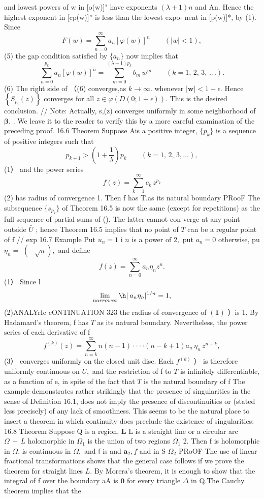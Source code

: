 and lowest powers of w in [o(w)]" have exponents $(\lambda+1)n$ and An. Hence the highest exponent in [cp(w)]” is less than the lowest expo- nent in [p(w)]*, by (1). Since $$ F(w)=\sum_{n=0}^{\infty}a_{n}[\varphi(w)]^{n}\qquad(|w|<1), $$ (5) the gap condition satisfied by $\{a_{n}\}$ now implies that $$ \sum_{n=0}^{p_{k}}a_{n}[\varphi(w)]^{n}=\sum_{m=0}^{(\lambda+1)p_{k}}b_{m}\,w^{m}\qquad(k=1,\,2,\,3,\,..\,.). $$ (6) The right side of （(6) converges,as $k\to\infty.$ whenever $|\mathbf{w}|<1+\epsilon.$ Hence $\left\{S_{p_{i}}(z)\right\}$ converges for all $z\in\varphi(D(0;1+\epsilon)).$ This is the desired conclusion. // Note: Actually, {s,(z)} converges uniformly in some neighborhood of ${\boldsymbol{\beta}}.$ . We leave it to the reader to verify this by a more careful examination of the preceding proof. 16.6 Theorem Suppose Ais a positive integer, $\{p_{k}\}$ is a sequence of positive integers such that $$ p_{k+1}>\left(1+{\frac{1}{\lambda}}\right)p_{k}\qquad(k=1,\,2,\,3,\ldots), $$ (1） and the power series $$ f(z)=\sum_{k=1}^{\infty}c_{k}\,z^{p_{k}} $$ (2) has radius of convergence 1. Then f has T.as its natural boundary PRooF The subsequence $\{s_{p_{k}}\}$ of Theorem 16.5 is now the same (except for repetitions) as the full sequence of partial sums of (). The latter cannot con verge at any point outside $\bar{U}$ ; hence Theorem 16.5 implies that no point of ${\mathbf{}}T$ can be a regular point of f // exp 16.7 Example Put $\scriptstyle u_{n}=1$ i $\scriptstyle n$ is a power of $2,$ put $a_{n}=0$ otherwise, pu $\eta_{n}=$ $(-{\sqrt{n}}),$ and define $$ f(z)=\sum_{n=0}^{\infty}a_{n}\eta_{n}z^{n}. $$ (1） Since l $$ \operatorname*{lim}_{n arrow\infty}\h|\:a_{n}\eta_{n}|^{1/n}=1, $$ (2)ANALYrIc cONTINUATION 323 the radius of convergence of $\mathbf{(1)}$ ）is 1. By Hadamard's theorem, f has ${\mathbf{}}T$ as its natural boundary. Nevertheless, the power series of each derivative of f $$ f^{(k)}(z)=\sum_{n=k}^{\infty}n(n-1)\cdot\cdot\cdot\cdot(n-k+1)a_{n}\,\eta_{n}\,z^{n-k}, $$ (3） converges uniformly on the closed unit disc. Each $f^{(k)}$ ） is therefore uniformly continuous on ${\tilde{U}},$ and the restriction of f to ${\mathbf{}}T$ is infinitely differentiable, as a function of e, in spite of the fact that ${\mathbf{}}T$ is the natural boundary of f The example demonstrates rather strikingly that the presence of singularities in the sense of Definition 16.1, does not imply the presence of discontinuities or (stated less precisely) of any lack of smoothness. This seems to be the natural place to insert a theorem in which continuity does preclude the existence of singularities: 16.8 Theorem Suppose Q is a region, ${\boldsymbol{L}}$ L is a straight line or a circular arc $\scriptstyle\Omega\,-\,L$ holomorphic in $\Omega_{1}$ is the union of two regions $\Omega_{1}$ 2. Then f is holomorphic in $\Omega.$ is continuous in $\Omega,$ and $\boldsymbol{\mathsf{f}}$ is and $\mathbf{a}_{2},f$ and in S $\Omega_{2}$ PRoOF The use of linear fractional transformations shows that the general case follows if we prove the theorem for straight lines $L.$ By Morera's theorem, it is enough to show that the integral of f over the boundary aA is $\mathbf{0}$ for every triangle $\Delta$ in Q.The Cauchy theorem implies that the 